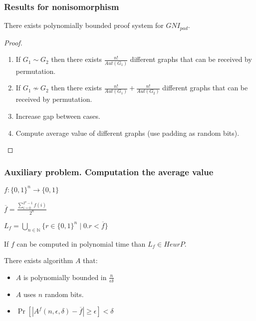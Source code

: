 \begin{frame}
    \frametitle{Results for nonisomorphism}

    \begin{theorem}
        There exists polynomially bounded proof system for $GNI_{pad}$.
    \end{theorem}

    \begin{proof}
        \begin{enumerate}
	        \item If $G_1 \sim G_2$ then there exists $\frac{n!}{Aut(G_1)}$ different
		        graphs that can be received by permutation.
            \item If $G_1 \nsim G_2$ then there exists $\frac{n!}{Aut(G_1)} +
		        \frac{n!}{Aut(G_2)}$ different graphs that can be received by permutation.
            \item Increase gap between cases.
        	\item Compute average value of different graphs (use padding as random bits).
        \end{enumerate}
    \end{proof}
\end{frame}

\begin{frame}
    \frametitle{Auxiliary problem. Computation the average value}

    $f:\{0, 1\}^{n} \rightarrow \{0, 1\}$
    
    $\overline{f} = \frac{\sum\limits_{i = 0}^{2^n - 1}f(i)}{2^n}$

    $L_f = \bigcup\limits_{n \in \mathbb{N}}\{r \in \{0, 1\}^n \mid 0.r < \overline{f}\}$

    \begin{lemma}
        If $f$ can be computed in polynomial time than $L_f \in HeurP$.
    \end{lemma}

    \begin{statement}
        There exists algorithm $A$ that:
        \begin{itemize}
	        \item $A$ is polynomially bounded in $\frac{n}{\epsilon\delta}$
        	\item $A$ uses $n$ random bits.
        	\item $\Pr[|A^{f}(n, \epsilon, \delta) - \overline{f}| \ge \epsilon] <
		        \delta$
        \end{itemize}
    \end{statement}
\end{frame}


